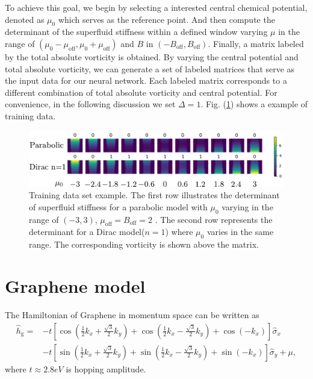 \documentclass{article}
\begin{document}
To achieve this goal, we begin by selecting a interested central chemical potential, denoted as $ \mu_0 $ which serves as the reference point. And then compute the determinant of the superfluid stiffness within a defined window varying $ \mu $ in the range of $ \left(\mu_0 - \mu_{\textrm{off}},\mu_0+ \mu_{\textrm{off} }   \right)$ and $ B $ in $ \left(-B_{\textrm{off}},B_{\textrm{off}}  \right) $. Finally, a matrix labeled by the total absolute vorticity is obtained. By varying the central potential and total absolute vorticity, we can generate a set of labeled matrices that serve as the input data for our neural network. Each labeled matrix corresponds to a different combination of total absolute vorticity and central potential. For convenience, in the following discussion we set $ \Delta = 1 $. Fig. (\ref{fig: Training Data}) shows a example of training data.

\begin{figure}[H]
    \centering
    \includegraphics[width=1\textwidth]{Training Data.pdf}
    \caption{Training data set example. The first row illustrates the determinant of superfluid stiffness for a parabolic model with $ \mu_0 $ varying in the range of $ \left(-3,3\right) $, $  \mu_{\textrm{off}} = B_{\textrm{off}} = 2$  . The second row represents the determinant for a Dirac model($ n=1 $) where $ \mu_0 $ varies in the same range. The corresponding vorticity is shown above the matrix.}
    \label{fig: Training Data}
\end{figure}

\section{Graphene model}
The Hamiltonian of Graphene in momentum space can be written as 
\begin{align}
    \hat{h}_{\textrm{g}} = &-t \left[\cos(\frac{1}{2}k_x + \frac{\sqrt{3}}{2} k_y )+ \cos(\frac{1}{2}k_x - \frac{\sqrt{3}}{2} k_{y}  )+ \cos(-k_x)\right] \hat{\sigma}_x \nonumber\\
    &-t \left[\sin(\frac{1}{2}k_x + \frac{\sqrt{3}}{2} k_y )+ \sin(\frac{1}{2}k_x - \frac{\sqrt{3}}{2} k_y )+ \sin(-k_x)\right] \hat{\sigma}_y+\mu,
\end{align}
where $ t \approx 2.8eV $ is hopping amplitude. 
\end{document}
